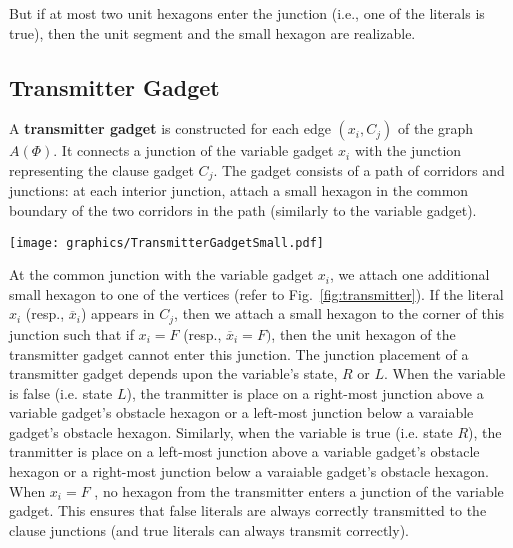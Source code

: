 But if at most two unit hexagons enter the junction (i.e., one of the literals is true), then the unit segment and the small hexagon are realizable.
\subsection{Transmitter Gadget}\label{transmitterGadget}
A {\bf transmitter gadget} is constructed for each edge $(x_i,C_j)$ of the graph $A(\Phi)$.
It connects a junction of the variable gadget $x_i$ with the junction representing the clause gadget $C_j$. 
The gadget consists of a path of corridors and junctions: at each interior junction, attach a small hexagon in the common boundary of the two corridors in the path (similarly to the variable gadget).

\begin{minipage}{\linewidth}
\begin{center}
\texttt{[image: graphics/TransmitterGadgetSmall.pdf]}
\label{fig:TransmitterGadgetSmall.pdf}
\end{center}
\end{minipage} 

At the common junction with the variable gadget $x_i$, we attach one additional small hexagon to one of the vertices (refer to Fig.~\ref{fig:transmitter}). 
If the literal $x_i$ (resp., $\overline{x}_i$) appears in $C_j$, then we attach a small hexagon to the corner of this junction such that if $x_i=F$ (resp., $\overline{x}_i=F)$, then the unit hexagon of the transmitter gadget cannot enter this junction. 
The junction placement of a transmitter gadget depends upon the variable's state, $R$ or $L$.
When the variable is false (i.e. state $L$), the tranmitter is place on a right-most junction above a variable gadget's obstacle hexagon or a left-most junction below a varaiable gadget's obstacle hexagon.
Similarly, when the variable is true (i.e. state $R$), the tranmitter is place on a left-most junction above a variable gadget's obstacle hexagon or a right-most junction below a varaiable gadget's obstacle hexagon.
When $x_i = F$ , no hexagon from the transmitter enters a junction of the variable gadget.
This ensures that false literals are always correctly transmitted to the clause junctions (and true literals can always transmit correctly).

